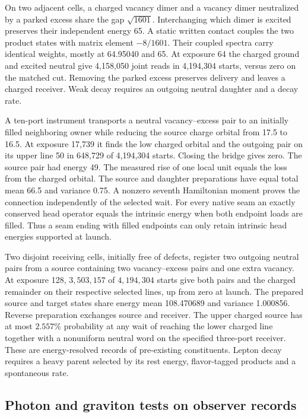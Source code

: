 On two adjacent cells, a charged vacancy dimer and a vacancy dimer
neutralized by a parked excess share the gap $\sqrt{1601}$. Interchanging
which dimer is excited preserves their independent energy 65. A static
written contact couples the two product states with matrix element
$-8/1601$. Their coupled spectra carry identical weights, mostly at
64.95040 and 65. At exposure 64 the charged ground and excited neutral
give 4,158,050 joint reads in 4,194,304 starts, versus zero on the
matched cut. Removing the parked excess preserves delivery and leaves
a charged receiver. Weak decay requires an outgoing neutral daughter
and a decay rate.

A ten-port instrument transports a neutral vacancy--excess pair to
an initially filled neighboring owner while reducing the source charge
orbital from 17.5 to 16.5. At exposure 17,739 it finds the low charged
orbital and the outgoing pair on its upper line 50 in 648,729 of
4,194,304 starts. Closing the bridge gives zero. The source pair had
energy 49. The measured rise of one local unit equals the loss
from the charged orbital. The source and daughter preparations have equal total mean
66.5 and variance 0.75. A nonzero seventh Hamiltonian moment proves
the connection independently of the selected wait. For every native
seam an exactly conserved head operator equals the intrinsic energy
when both endpoint loads are filled. Thus a seam ending with filled
endpoints can only retain intrinsic head energies supported at
launch.

Two disjoint receiving cells, initially free of defects, register two
outgoing neutral pairs from a source containing two vacancy--excess
pairs and one extra vacancy. At exposure 128, $3{,}503{,}157$ of
$4{,}194{,}304$ starts give both pairs and the charged remainder
on their respective selected lines, up from zero at launch. The
prepared source and target states share energy mean 108.470689 and
variance 1.000856. Reverse preparation exchanges source and receiver.
The upper charged source has at most $2.557\%$ probability at any
wait of reaching the lower charged line together with a nonuniform
neutral word on the specified three-port receiver. These are
energy-resolved records of pre-existing constituents.
Lepton decay requires a heavy parent selected by its rest energy,
flavor-tagged products and a spontaneous rate.

\subsection{Photon and graviton tests on observer records}
\label{sec:cms-mediator-identity}

